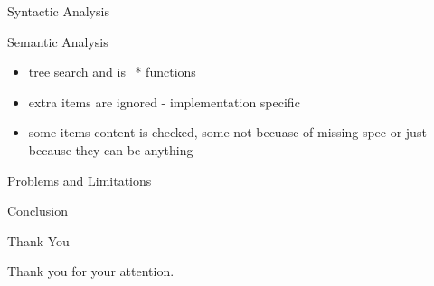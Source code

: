\documentclass{beamer}
\begin{document}
\begin{frame}{Syntactic Analysis}

\end{frame}

\begin{frame}{Semantic Analysis}
\begin{itemize}
	\item tree search and is\_* functions
	\item extra items are ignored - implementation specific
	\item some items content is checked, some not becuase of missing spec or just because they can be anything
\end{itemize}
\end{frame}

\begin{frame}{Problems and Limitations}

\end{frame}

\begin{frame}{Conclusion}

\end{frame}

\begin{frame}{Thank You}
    \Huge{\centerline{Thank you for your attention.}}
\end{frame}

\end{document}
